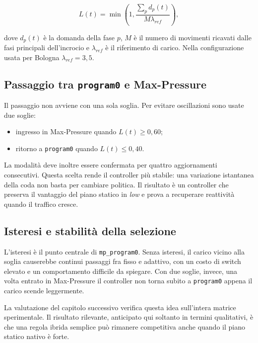 \documentclass[12pt,a4paper,oneside]{report}
\numberwithin{equation}{chapter}
\begin{document}
\begin{equation}
    L(t)=\min\left(1,\frac{\sum_p d_p(t)}{M\lambda_{ref}}\right),
    \label{eq:program0-load}
\end{equation}

dove \(d_p(t)\) è la domanda della fase \(p\), \(M\) è il numero di movimenti
ricavati dalle fasi principali dell'incrocio e \(\lambda_{ref}\) è il
riferimento di carico. Nella configurazione usata per Bologna
\(\lambda_{ref}=3{,}5\).

\subsection{Passaggio tra \texttt{program0} e Max-Pressure}

Il passaggio non avviene con una sola soglia. Per evitare oscillazioni sono
usate due soglie:

\begin{itemize}
    \item ingresso in Max-Pressure quando \(L(t)\geq 0{,}60\);
    \item ritorno a \texttt{program0} quando \(L(t)\leq 0{,}40\).
\end{itemize}

La modalità deve inoltre essere confermata per quattro aggiornamenti consecutivi. Questa
scelta rende il controller più stabile: una variazione istantanea della coda
non basta per cambiare politica. Il risultato è un controller che preserva il
vantaggio del piano statico in \emph{low} e prova a recuperare reattività quando il
traffico cresce.

\subsection{Isteresi e stabilità della selezione}

L'isteresi è il punto centrale di \texttt{mp\_program0}. Senza isteresi, il
carico vicino alla soglia causerebbe continui passaggi fra fisso e adattivo,
con un costo di switch elevato e un comportamento difficile da spiegare. Con
due soglie, invece, una volta entrato in Max-Pressure il controller non torna
subito a \texttt{program0} appena il carico scende leggermente.

La valutazione del capitolo successivo verifica questa idea sull'intera matrice
sperimentale. Il risultato rilevante, anticipato qui soltanto in termini
qualitativi, è che una regola ibrida semplice può rimanere competitiva anche
quando il piano statico nativo è forte.
\end{document}
